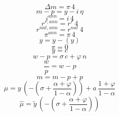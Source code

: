\documentclass[12pt]{article}
\newcommand{\1}{\mathbbm 1}
\begin{document}
\begin{equation*}
	{{\Delta m}}={{\pi}}\, 4
\end{equation*}
\begin{equation*}
	{{m-p}}={{y}}-{{i}}\, {{\eta}}
\end{equation*}
\begin{equation*}
	{{i^{ann}}}={{i}}\, 4
\end{equation*}
\begin{equation*}
	{{r^{r,ann}}}={{r^r}}\, 4
\end{equation*}
\begin{equation*}
	{{r^{nat,ann}}}={{r^{nat}}}\, 4
\end{equation*}
\begin{equation*}
	{{\pi^{ann}}}={{\pi}}\, 4
\end{equation*}
\begin{equation*}
	{{\hat y}}={{y}}-({{y}})
\end{equation*}
\begin{equation*}
	{{\pi}}=0
\end{equation*}
\begin{equation*}
	{{y}}={{c}}
\end{equation*}
\begin{equation*}
	{{w}}-{{p}}={{\sigma}}\, {{c}}+{{\varphi}}\, {{n}}
\end{equation*}
\begin{equation*}
	{{\frac{w}{p}}}={{w}}-{{p}}
\end{equation*}
\begin{equation*}
	{{m}}={{m-p}}+{{p}}
\end{equation*}
\begin{equation*}
	{{\mu}}={{y}}\, \left(-\left({{\sigma}}+\frac{{{\alpha}}+{{\varphi}}}{1-{{\alpha}}}\right)\right)+{{a}}\, \frac{1+{{\varphi}}}{1-{{\alpha}}}
\end{equation*}
\begin{equation*}
	{{\hat \mu}}={{\tilde y}}\, \left(-\left({{\sigma}}+\frac{{{\alpha}}+{{\varphi}}}{1-{{\alpha}}}\right)\right)
\end{equation*}


		
	
	
	\newpage
	\singlespacing
	\newpage
	
	
	\clearpage
	
	
	
	
	
	
	
	
	
\end{document}
